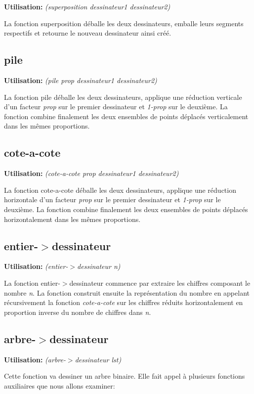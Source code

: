 \documentclass[10pt]{article}
\newcommand{\usage}[1]{\textbf{Utilisation: }\emph{#1}}
\begin{document}
\usage{(superposition dessinateur1 dessinateur2)}

La fonction superposition déballe les deux dessinateurs, emballe leurs
segments respectifs et retourne le nouveau dessinateur ainsi créé.


\subsection{pile}

\usage{(pile prop dessinateur1 dessinateur2)}

La fonction pile déballe les deux dessinateurs, applique une réduction
verticale d'un facteur \emph{prop} sur le premier dessinateur et
\emph{1-prop} sur le deuxième. La fonction combine finalement les deux
ensembles de points déplacés verticalement dans les mêmes proportions.


\subsection{cote-a-cote}

\usage{(cote-a-cote prop dessinateur1 dessinateur2)}

La fonction cote-a-cote déballe les deux dessinateurs, applique une
réduction horizontale d'un facteur \emph{prop} sur le premier
dessinateur et \emph{1-prop} sur le deuxième. La fonction combine
finalement les deux ensembles de points déplacés horizontalement dans
les mêmes proportions.


\subsection{entier-$>$dessinateur}

\usage{(entier-$>$dessinateur n)}

La fonction entier-$>$dessinateur commence par extraire les chiffres
composant le nombre \emph{n}. La fonction construit ensuite la
représentation du nombre en appelant récursivement la fonction
\emph{cote-a-cote} sur les chiffres réduits horizontalement en
proportion inverse du nombre de chiffres dans \emph{n}.


\subsection{arbre-$>$dessinateur}

\usage{(arbre-$>$dessinateur lst)}

Cette fonction va dessiner un arbre binaire.  Elle fait appel à
plusieurs fonctions auxiliaires que nous allons examiner:
\end{document}

